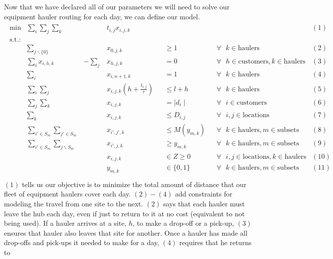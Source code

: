 \documentclass[letterpaper,10pt,english]{sphinxmanual}
\begin{document}
Now that we have declared all of our parameters we will need to solve our
equipment hauler routing for each day, we can define our model.
\begin{align*}\!\begin{aligned}
\text{min} &\sum_{i} \sum_{j} \sum_{k} & &t_{i,j}x_{i,j,k} & & & & &(1)\\
\text{s.t.:}\\
&\sum_{j\backslash\{0\}} & &x_{0,j,k} & &\geq 1 & &\forall \text{ } k \in
\text{haulers} &(2)\\
&\sum_{i} x_{i,h,k} &-\sum_{j} &x_{h,j,k} & &= 0 & &\forall \text{ } h \in
\text{customers}, k \in \text{haulers} &(3)\\
&\sum_{i} & &x_{i,n+1,k} & &= 1 & &\forall \text{ } k \in \text{haulers}
&(4)\\
&\sum_{i} \sum_{j} & &x_{i,j,k}(h + \frac{t_{i,j}}{r}) & &\leq l + h &
&\forall \text{ } k \in \text{haulers} &(5)\\
&\sum_{j} \sum_{k} & &x_{i,j,k} & &= \mid d_{i} \mid & &\forall \text{ } i
\in \text{customers} &(6)\\
&\sum_{k} & &x_{i,j,k} & &\leq D_{i,j} & &\forall \text{ } i,j \in
\text{locations} &(7)\\
&\sum_{i' \in S_{m}} \sum_{j' \in S_{m}} & &x_{i',j',k} & &\leq M(y_{m,k}) &
&\forall \text{ } k \in \text{haulers}, m \in \text{subsets} &(8)\\
&\sum_{i' \in S_{m}} \sum_{j \backslash S_{m}} & &x_{i',j,k} & &\geq
y_{m,k} & &\forall \text{ } k \in \text{haulers}, m \in \text{subsets} &(9)\\
& & &x_{i,j,k} & &\in Z \geq 0 & &\forall \text{ } i,j \in \text{locations},
k \in \text{haulers} &(10)\\
& & &y_{m,k} & &\in \{0,1\} & &\forall \text{ } k \in \text{haulers}, m
\in \text{subsets} &(11)\\
\end{aligned}\end{align*}
\((1)\) tells us our objective is to minimize the total amount of distance
that our fleet of equipment haulers cover each day. \((2)-(4)\)
add constraints for modeling the travel from one site to the next. \((2)\)
says that each hauler must leave the hub each day, even if just to return to it
at no cost (equivalent to not being used). If a hauler arrives at a site,
\(h\), to make a drop-off or a pick-up, \((3)\) ensures that hauler
also leaves that site for another. Once a hauler has made all drop-offs and
pick-ups it needed to make for a day, \((4)\) requires that he returns to
\end{document}
